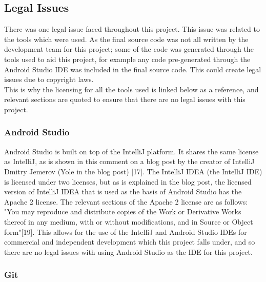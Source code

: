 \documentclass{article}
\begin{document}
\subsection{Legal Issues}

There was one legal issue faced throughout this project. This issue was related to the tools which were used. As the final source code was not all written by the development team for this project; some of the code was generated through the tools used to aid this project, for example any code pre-generated through the Android Studio IDE was included in the final source code. This could create legal issues due to copyright laws. \\

This is why the licensing for all the tools used is linked below as a reference, and relevant sections are quoted to ensure that there are no legal issues with this project. \\

\subsubsection{Android Studio}

Android Studio is built on top of the IntelliJ platform. It shares the same license as IntelliJ, as is shown in this comment on a blog post by the creator of IntelliJ Dmitry Jemerov (Yole in the blog post) [17]. The IntelliJ IDEA (the IntelliJ IDE) is licensed under two licenses, but as is explained in the blog post, the licensed version of IntelliJ IDEA that is used as the basis of Android Studio has the Apache 2 license. The relevant sections of the Apache 2 license are as follows: "You may reproduce and distribute copies of the Work or Derivative Works thereof in any medium, with or without modifications, and in Source or Object form"[19]. This allows for the use of the IntelliJ and Android Studio IDEs for commercial and independent development which this project falls under, and so there are no legal issues with using Android Studio as the IDE for this project. \\


\subsubsection{Git}
\end{document}
